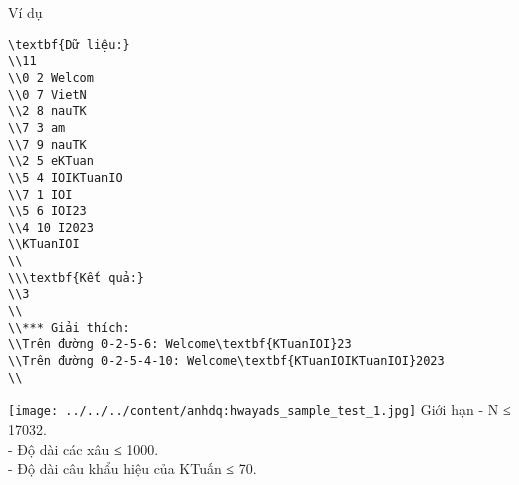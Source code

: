 Ví dụ  
\begin{verbatim}
\textbf{Dữ liệu:}
\\11
\\0 2 Welcom
\\0 7 VietN
\\2 8 nauTK
\\7 3 am
\\7 9 nauTK
\\2 5 eKTuan
\\5 4 IOIKTuanIO
\\7 1 IOI
\\5 6 IOI23
\\4 10 I2023
\\KTuanIOI
\\
\\\textbf{Kết quả:}
\\3
\\
\\*** Giải thích:
\\Trên đường 0-2-5-6: Welcome\textbf{KTuanIOI}23
\\Trên đường 0-2-5-4-10: Welcome\textbf{KTuanIOIKTuanIOI}2023
\\\end{verbatim}


\texttt{[image: ../../../content/anhdq:hwayads\_sample\_test\_1.jpg]}
   Giới hạn  
- N ≤ 17032.   
\\   - Độ dài các xâu ≤ 1000.   
\\   - Độ dài câu khẩu hiệu của KTuấn ≤ 70.